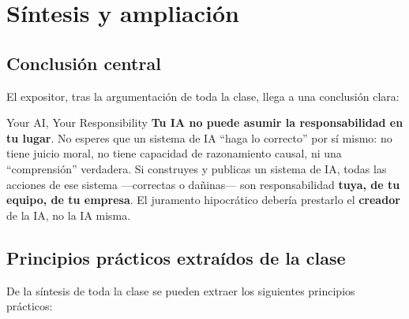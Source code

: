 \section{Síntesis y ampliación}

\subsection{Conclusión central}

El expositor, tras la argumentación de toda la clase, llega a una conclusión clara:

\begin{importantbox}{{Your AI, Your Responsibility}}
\textbf{Tu IA no puede asumir la responsabilidad en tu lugar}. No esperes que un sistema de IA ``haga lo correcto'' por sí mismo: no tiene juicio moral, no tiene capacidad de razonamiento causal, ni una ``comprensión'' verdadera. Si construyes y publicas un sistema de IA, todas las acciones de ese sistema —correctas o dañinas— son responsabilidad \textbf{tuya, de tu equipo, de tu empresa}. El juramento hipocrático debería prestarlo el \textbf{creador} de la IA, no la IA misma.
\end{importantbox}

\subsection{Principios prácticos extraídos de la clase}

De la síntesis de toda la clase se pueden extraer los siguientes principios prácticos:

